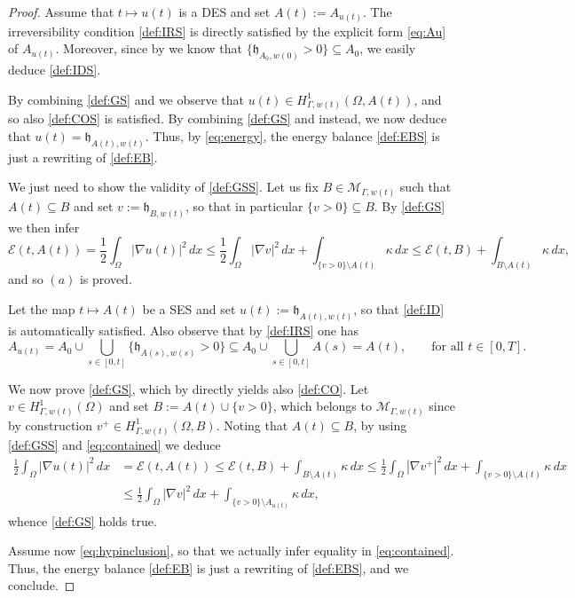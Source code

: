 \documentclass[a4paper,11pt,reqno]{amsart}
\numberwithin{equation}{section}
\theoremstyle{definition}
\theoremstyle{remark}
\begin{document}
\begin{proof}
    Assume that $t\mapsto u(t)$ is a DES and set $A(t):=A_{u(t)}$. The irreversibility condition \ref{def:IRS} is directly satisfied by the explicit form \eqref{eq:Au} of $A_{u(t)}$. Moreover, since by  we know that $\{\mathfrak{h}_{A_0,w(0)}>0\}\subseteq A_0$, we easily deduce \ref{def:IDS}.

    By combining \ref{def:GS} and  we observe that $u(t)\in H^1_{\Gamma,w(t)}(\Omega,A(t))$, and so also \ref{def:COS} is satisfied. By combining \ref{def:GS} and  instead, we now deduce that $u(t)=\mathfrak{h}_{A(t),w(t)}$. Thus, by \eqref{eq:energy}, the energy balance \ref{def:EBS} is just a rewriting of \ref{def:EB}.

    We just need to show the validity of \ref{def:GSS}. Let us fix $B\in \mathcal M_{\Gamma,w(t)}$ such that $A(t)\subseteq B$ and set $v:=\mathfrak{h}_{B,w(t)}$, so that in particular $\{v>0\}\subseteq B$. By \ref{def:GS} we then infer
    \begin{equation}
        \mathcal E(t,A(t))=\frac 12 \int_\Omega |\nabla u(t)|^2 \, dx\le \frac 12 \int_\Omega |\nabla v|^2 \, dx+\int_{\{v>0\}\setminus A(t)}\kappa\, dx\le \mathcal E(t,B)+\int_{B\setminus A(t)}\kappa\, dx,
    \end{equation}
    and so $(a)$ is proved.

    Let the map $t\mapsto A(t)$ be a SES and set $u(t):= \mathfrak{h}_{A(t),w(t)}$, so that \ref{def:ID} is automatically satisfied. Also observe that by \ref{def:IRS} one has
     \begin{equation}\label{eq:contained}
         A_{u(t)}=A_0\cup \bigcup_{s\in [0,t]}\{\mathfrak{h}_{A(s),w(s)}>0\}\subseteq A_0\cup \bigcup_{s\in [0,t]} A(s)=A(t),\qquad\text{for all }t\in [0,T]. 
     \end{equation}

    We now prove \ref{def:GS}, which by  directly yields also \ref{def:CO}. Let $v\in H^1_{\Gamma,w(t)}(\Omega)$ and set $B:=A(t)\cup \{v>0\}$, which belongs to $\mathcal M_{\Gamma,w(t)}$ since by construction $v^+\in H^1_{\Gamma,w(t)}(\Omega,B)$. Noting that $A(t)\subseteq B$, by using \ref{def:GSS} and \eqref{eq:contained} we deduce
    \begin{align}
       \frac 12 \int_\Omega |\nabla u(t)|^2 \, dx&=  \mathcal E(t,A(t))\le \mathcal E(t,B)+\int_{B\setminus A(t)}\kappa\, dx\le \frac 12\int_\Omega |\nabla v^+|^2 \, dx+\int_{\{v>0\}\setminus A(t)}\kappa\, dx\\&
       \le \frac 12\int_\Omega |\nabla v|^2 \, dx+\int_{\{v>0\}\setminus A_{u(t)}}\kappa\, dx,
    \end{align}
    whence \ref{def:GS} holds true.

    Assume now \eqref{eq:hypinclusion}, so that we actually infer equality in \eqref{eq:contained}. Thus, the energy balance \ref{def:EB} is just a rewriting of \ref{def:EBS}, and we conclude.
\end{proof}
\end{document}
